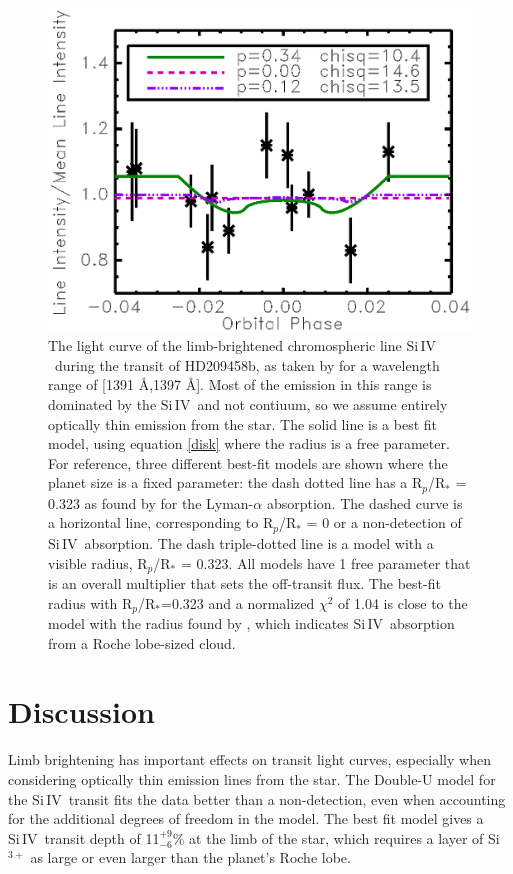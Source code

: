 \documentclass[manuscript]{aastex}
\newcommand{\siIV}{\ensuremath{\mathrm{Si}\,\scriptstyle \mathrm{IV}}}
\begin{document}

\begin{figure}[!ht]
\begin{center}
\includegraphics[width=0.5 \textwidth]{hd209458.eps}
\caption{The light curve of the limb-brightened chromospheric line \siIV\ during the transit of HD209458b, as taken by \citet{vidmad} for a wavelength range of [1391 \AA,1397 \AA]. Most of the emission in this range is dominated by the \siIV\ and not contiuum, so we assume entirely optically thin emission from the star. The solid line is a best fit model, using equation \ref{disk} where the radius is a free parameter. For reference, three different best-fit models are shown where the planet size is a fixed parameter: the dash dotted line has a R$_p$/R$_*$ = 0.323 as found by \citet{vidmad} for the Lyman-$\alpha$ absorption. The dashed curve is a horizontal line, corresponding to R$_p$/R$_*$ = 0 or a non-detection of \siIV\ absorption. The dash triple-dotted line is a model with a visible radius, R$_p$/R$_*$ = 0.323. All models have 1 free parameter that is an overall multiplier that sets the off-transit flux. The best-fit radius with R$_p$/R$_*$=0.323 and a normalized $\chi^2$ of 1.04 is close to the model with the radius found by \citet{vidmad}, which indicates \siIV\ absorption from a Roche lobe-sized cloud. }
\end{center}
\label{lightc}
\end{figure}

\section{Discussion} \label{discuss}

Limb brightening has important effects on transit light curves, especially when considering optically thin emission lines from the star. The Double-U model for the \siIV\ transit fits the data better than a non-detection, even when accounting for the additional degrees of freedom in the model. The best fit model gives a \siIV\ transit depth of 11$^{+9}_{-6}$\% at the limb  of the star, which requires a layer of Si$^{3+}$ as large or even larger than the planet's Roche lobe.
\end{document}
